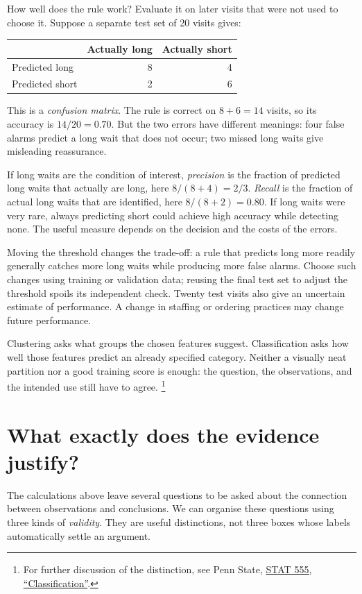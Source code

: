 How well does the rule work? Evaluate it on later visits that were not
used to choose it. Suppose a separate test set of 20 visits gives:
\begin{center}
\begin{tabular}{lrr}
\toprule
 & Actually long & Actually short\\
\midrule
Predicted long & 8 & 4\\
Predicted short & 2 & 6\\
\bottomrule
\end{tabular}
\end{center}
This is a \emph{confusion matrix}. The rule is correct on $8+6=14$ visits,
so its accuracy is $14/20=0.70$. But the two errors have different meanings:
four false alarms predict a long wait that does not occur; two missed
long waits give misleading reassurance.

If long waits are the condition of interest, \emph{precision} is the
fraction of predicted long waits that actually are long, here
$8/(8+4)=2/3$. \emph{Recall} is the fraction of actual long waits that are
identified, here $8/(8+2)=0.80$. If long waits were very rare, always
predicting short could achieve high accuracy while detecting none.
The useful measure depends on the decision and the costs of the errors.

Moving the threshold changes the trade-off: a rule that predicts long
more readily generally catches more long waits while producing more
false alarms. Choose such changes using training or validation data;
reusing the final test set to adjust the threshold spoils its independent
check. Twenty test visits also give an uncertain estimate of performance.
A change in staffing or ordering practices may change future performance.

Clustering asks what groups the chosen features suggest. Classification
asks how well those features predict an already specified category.
Neither a visually neat partition nor a good training score is enough:
the question, the observations, and the intended use still have to agree.
\footnote{For further discussion of the distinction, see Penn State,
\href{https://online.stat.psu.edu/stat555/node/17/}{STAT 555, ``Classification''}.}

\section{What exactly does the evidence justify?}
\label{sec:ds-validity}
The calculations above leave several questions to be asked about the
connection between observations and conclusions. We can organise these
questions using three kinds of \emph{validity}. They are useful distinctions,
not three boxes whose labels automatically settle an argument.

